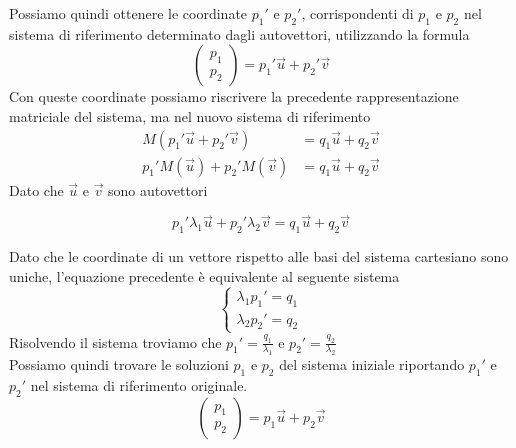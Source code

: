 \documentclass[10pt,a4paper]{article}
\theoremstyle{plain}
\theoremstyle{definition}
\begin{document}
Possiamo quindi ottenere le coordinate $p_1'$ e $p_2'$, corrispondenti di $p_1$ e $p_2$ nel sistema di riferimento determinato dagli autovettori, utilizzando la formula 
\[
\begin{pmatrix}
	p_1 \\
	p_2
\end{pmatrix}=p_1'\vec{u}+p_2'\vec{v}
\]
Con queste coordinate possiamo riscrivere la precedente rappresentazione matriciale del sistema, ma nel nuovo sistema di riferimento
\begin{align*}
M(p_1'\vec{u}+p_2'\vec{v})&=q_1\vec{u}+q_2\vec{v}\\
p_1'M(\vec{u})+p_2'M(\vec{v})&=q_1\vec{u}+q_2\vec{v}
\end{align*}
Dato che $\vec{u}$ e $\vec{v}$ sono autovettori

\[
p_1'\lambda_1\vec{u}+p_2'\lambda_2\vec{v}=q_1\vec{u}+q_2\vec{v}
\]

Dato che le coordinate di un vettore rispetto alle basi del sistema cartesiano sono uniche, l'equazione precedente è equivalente al seguente sistema
\[
\begin{cases*}
	\lambda_1p_1'=q_1 \\
	\lambda_2p_2'=q_2	
\end{cases*}
\]
Risolvendo il sistema troviamo che $p_1'=\frac{q_1}{\lambda_1}$ e $p_2'=\frac{q_2}{\lambda_2}$\\
Possiamo quindi trovare le soluzioni $p_1$ e $p_2$ del sistema iniziale riportando $p_1'$ e $p_2'$ nel sistema di riferimento originale.
\[
\begin{pmatrix}
	p_1 \\
	p_2
\end{pmatrix}
=
p_1\vec{u}+p_2\vec{v}
\]
\end{document}
